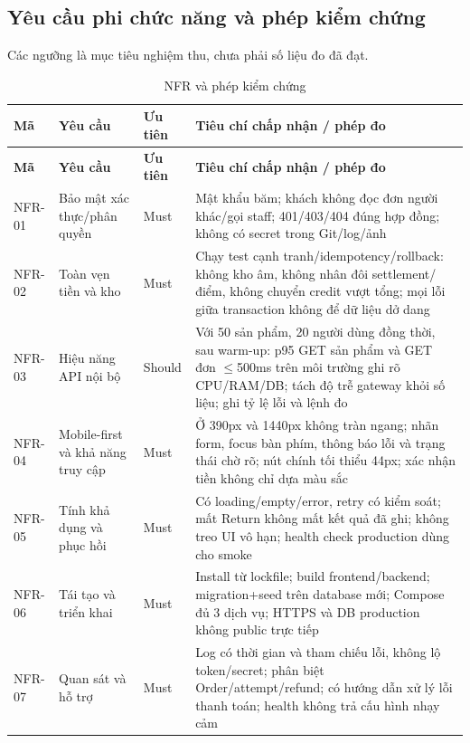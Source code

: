 \subsection{Yêu cầu phi chức năng và phép kiểm chứng}
Các ngưỡng là mục tiêu nghiệm thu, chưa phải số liệu đo đã đạt.
\begingroup\footnotesize\setlength{\tabcolsep}{3pt}
\begin{longtable}{|>{\raggedright\arraybackslash}p{}|>{\raggedright\arraybackslash}p{}|>{\raggedright\arraybackslash}p{}|>{\raggedright\arraybackslash}p{}|}
\caption{NFR và phép kiểm chứng}\\\hline
\textbf{Mã} & \textbf{Yêu cầu} & \textbf{Ưu tiên} & \textbf{Tiêu chí chấp nhận / phép đo} \\ \hline
\endfirsthead
\hline
\textbf{Mã} & \textbf{Yêu cầu} & \textbf{Ưu tiên} & \textbf{Tiêu chí chấp nhận / phép đo} \\ \hline
\endhead
NFR-01 & Bảo mật xác thực/phân quyền & Must & Mật khẩu băm; khách không đọc đơn người khác/gọi staff; 401/403/404 đúng hợp đồng; không có secret trong Git/log/ảnh \\ \hline
NFR-02 & Toàn vẹn tiền và kho & Must & Chạy test cạnh tranh/idempotency/rollback: không kho âm, không nhân đôi settlement/điểm, không chuyển credit vượt tổng; mọi lỗi giữa transaction không để dữ liệu dở dang \\ \hline
NFR-03 & Hiệu năng API nội bộ & Should & Với 50 sản phẩm, 20 người dùng đồng thời, sau warm-up: p95 GET sản phẩm và GET đơn \(\leq\)500ms trên môi trường ghi rõ CPU/RAM/DB; tách độ trễ gateway khỏi số liệu; ghi tỷ lệ lỗi và lệnh đo \\ \hline
NFR-04 & Mobile-first và khả năng truy cập & Must & Ở 390px và 1440px không tràn ngang; nhãn form, focus bàn phím, thông báo lỗi và trạng thái chờ rõ; nút chính tối thiểu 44px; xác nhận tiền không chỉ dựa màu sắc \\ \hline
NFR-05 & Tính khả dụng và phục hồi & Must & Có loading/empty/error, retry có kiểm soát; mất Return không mất kết quả đã ghi; không treo UI vô hạn; health check production dùng cho smoke \\ \hline
NFR-06 & Tái tạo và triển khai & Must & Install từ lockfile; build frontend/backend; migration+seed trên database mới; Compose đủ 3 dịch vụ; HTTPS và DB production không public trực tiếp \\ \hline
NFR-07 & Quan sát và hỗ trợ & Must & Log có thời gian và tham chiếu lỗi, không lộ token/secret; phân biệt Order/attempt/refund; có hướng dẫn xử lý lỗi thanh toán; health không trả cấu hình nhạy cảm \\ \hline

\end{longtable}
